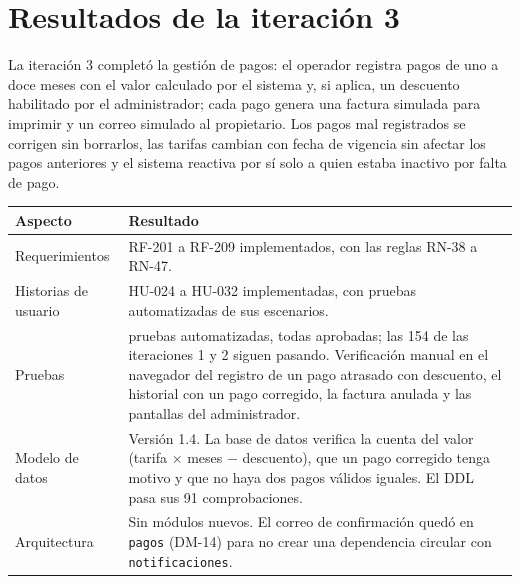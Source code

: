 \section{Resultados de la iteración 3}
La iteración 3 completó la gestión de pagos: el operador registra pagos de uno a doce meses con el valor calculado por el sistema y, si aplica, un descuento habilitado por el administrador; cada pago genera una factura simulada para imprimir y un correo simulado al propietario. Los pagos mal registrados se corrigen sin borrarlos, las tarifas cambian con fecha de vigencia sin afectar los pagos anteriores y el sistema reactiva por sí solo a quien estaba inactivo por falta de pago.

\begin{longtable}{>{\raggedright\arraybackslash}p{4.6cm}>{\raggedright\arraybackslash}p{9.8cm}}
\toprule
\textbf{Aspecto} & \textbf{Resultado}\\
\midrule\endhead
Requerimientos & RF-201 a RF-209 implementados, con las reglas RN-38 a RN-47.\\
Historias de usuario & HU-024 a HU-032 implementadas, con pruebas automatizadas de sus escenarios.\\
Pruebas & 240 pruebas automatizadas, todas aprobadas; las 154 de las iteraciones 1 y 2 siguen pasando. Verificación manual en el navegador del registro de un pago atrasado con descuento, el historial con un pago corregido, la factura anulada y las pantallas del administrador.\\
Modelo de datos & Versión 1.4. La base de datos verifica la cuenta del valor (tarifa $\times$ meses $-$ descuento), que un pago corregido tenga motivo y que no haya dos pagos válidos iguales. El DDL pasa sus 91 comprobaciones.\\
Arquitectura & Sin módulos nuevos. El correo de confirmación quedó en \texttt{pagos} (DM-14) para no crear una dependencia circular con \texttt{notificaciones}.\\
\bottomrule
\end{longtable}

